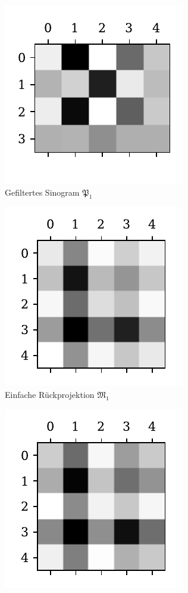 \documentclass[slug=PET, room=Andreas-Schubert-Bau\,\ 424A, supervisor=Carsten\ Bittrich, coursedate=10.\ 01.\ 2020]{../../Lab_Report_LaTeX/lab_report}
\begin{document}
\begin{figure}[htp]
  \begin{subfigure}[t]{.25\textwidth}
    \centering
    \includegraphics[width=.6\textwidth]{../auswertung/figs/theory/convoluted.pdf}
    \caption{Gefiltertes Sinogram \(\mathfrak{P}_1\)}
    \label{fig:theory-convoluted}
  \end{subfigure}
  \begin{subfigure}[t]{.25\textwidth}
    \centering
    \includegraphics[width=.6\textwidth]{../auswertung/figs/theory/rec_simple.pdf}
    \caption{Einfache R\"uckprojektion \(\mathfrak{M}_1\)}
    \label{fig:theory-rec_simple}
  \end{subfigure}
  \begin{subfigure}[t]{.25\textwidth}
    \centering
    \includegraphics[width=.6\textwidth]{../auswertung/figs/theory/rec_filtered.pdf}

\end{subfigure}
\end{figure}
\end{document}
